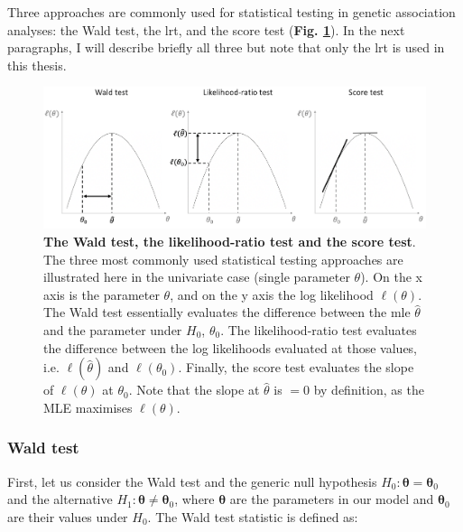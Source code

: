 
\vspace{5mm}

Three approaches are commonly used for statistical testing in genetic association analyses: the Wald test, the \gls{lrt}, and the score test (\textbf{Fig. \ref{fig:hypothesis_tests}}).
In the next paragraphs, I will describe briefly all three but note that only the \gls{lrt} is used in this thesis.

\begin{figure}[h]
\centering
\includegraphics[width=15cm]{Chapter2/Fig/wald_lrt_score_tests.png}
\caption[Wald, LRT and score test]{\textbf{The Wald test, the likelihood-ratio test and the score test}.\\
The three most commonly used statistical testing approaches are illustrated here in the univariate case (single parameter $\theta$). 
On the x axis is the parameter $\theta$, and on the y axis the log likelihood $\ell(\theta)$.
The Wald test essentially evaluates the difference between the \gls{mle} $\hat{\theta}$ and the parameter under $H_0$, $\theta_0$.
The likelihood-ratio test evaluates the difference between the log likelihoods evaluated at those values, i.e. $\ell(\hat{\theta})$ and $\ell(\theta_0)$.
Finally, the score test evaluates the slope of $\ell(\theta)$ at $\theta_0$. Note that the slope at $\hat{\theta}$ is $=0$ by definition, as the MLE maximises $\ell(\theta)$.}
\label{fig:hypothesis_tests}
\end{figure}

\newpage

\subsubsection{Wald test}

First, let us consider the Wald test and the generic null hypothesis $H_0: \boldsymbol{\theta} = \boldsymbol{\theta}_0$ and the alternative $H_1: \boldsymbol{\theta} \neq \boldsymbol{\theta}_0$, where $\boldsymbol{\theta}$ are the parameters in our model and $\boldsymbol{\theta}_0$ are their values under $H_0$.
The Wald test statistic is defined as:

